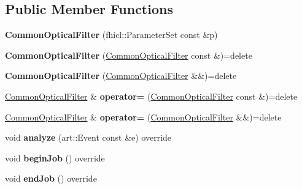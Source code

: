 \subsection*{Public Member Functions}
\begin{DoxyCompactItemize}
\item 
\hypertarget{classCommonOpticalFilter_a81f6d22db0a88f0d6c484130b689ceae}{{\bfseries Common\-Optical\-Filter} (fhicl\-::\-Parameter\-Set const \&p)}\label{classCommonOpticalFilter_a81f6d22db0a88f0d6c484130b689ceae}

\item 
\hypertarget{classCommonOpticalFilter_a45ceeadd04ac3623d214753aa21aa0f1}{{\bfseries Common\-Optical\-Filter} (\hyperlink{classCommonOpticalFilter}{Common\-Optical\-Filter} const \&)=delete}\label{classCommonOpticalFilter_a45ceeadd04ac3623d214753aa21aa0f1}

\item 
\hypertarget{classCommonOpticalFilter_af39ba3d2916d1dab8459c5bc2fda8963}{{\bfseries Common\-Optical\-Filter} (\hyperlink{classCommonOpticalFilter}{Common\-Optical\-Filter} \&\&)=delete}\label{classCommonOpticalFilter_af39ba3d2916d1dab8459c5bc2fda8963}

\item 
\hypertarget{classCommonOpticalFilter_a68bfc736eeb9dafa17ea51d7f8d5191a}{\hyperlink{classCommonOpticalFilter}{Common\-Optical\-Filter} \& {\bfseries operator=} (\hyperlink{classCommonOpticalFilter}{Common\-Optical\-Filter} const \&)=delete}\label{classCommonOpticalFilter_a68bfc736eeb9dafa17ea51d7f8d5191a}

\item 
\hypertarget{classCommonOpticalFilter_aadd7bd59c546371f0d2c1b06fc187d7b}{\hyperlink{classCommonOpticalFilter}{Common\-Optical\-Filter} \& {\bfseries operator=} (\hyperlink{classCommonOpticalFilter}{Common\-Optical\-Filter} \&\&)=delete}\label{classCommonOpticalFilter_aadd7bd59c546371f0d2c1b06fc187d7b}

\item 
\hypertarget{classCommonOpticalFilter_a4e474389d55dc9d143a96636a7222880}{void {\bfseries analyze} (art\-::\-Event const \&e) override}\label{classCommonOpticalFilter_a4e474389d55dc9d143a96636a7222880}

\item 
\hypertarget{classCommonOpticalFilter_ae1d42b367bfb18eb5a7ac9714a3c534d}{void {\bfseries begin\-Job} () override}\label{classCommonOpticalFilter_ae1d42b367bfb18eb5a7ac9714a3c534d}

\item 
\hypertarget{classCommonOpticalFilter_ae29e456913b0021782b5006404b30a3f}{void {\bfseries end\-Job} () override}\label{classCommonOpticalFilter_ae29e456913b0021782b5006404b30a3f}

\end{DoxyCompactItemize}
